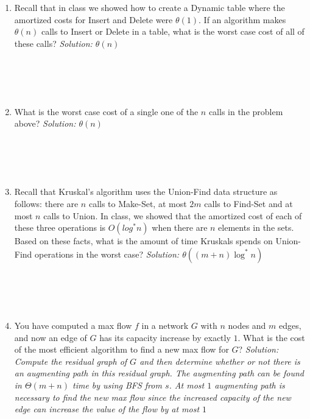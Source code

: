 \documentclass[11pt]{article}
\newcommand{\ans}[1]{\emph{Solution: #1}}
\begin{document}
\begin{enumerate}
\begin{enumerate}
\item Recall that in class we showed how to create a Dynamic table where the amortized costs for Insert and Delete were $\theta(1)$.  If an algorithm makes $\theta(n)$ calls to Insert or Delete in a table, what is the worst case cost of all of these calls?  \ans{$\theta(n)$} \\ \ \\ \ \\ \ \\ \ \\

\item What is the worst case cost of a single one of the $n$ calls in the problem above?  \ans{$\theta(n)$} \\ \ \\ \ \\ \ \\ \ \\

\item Recall that Kruskal's algorithm uses the Union-Find data structure as follows: there are $n$ calls to Make-Set, at most $2m$ calls to Find-Set and at most $n$ calls to Union.  In class, we showed that the amortized cost of each of these three operations is $O(log^{*} n)$ when there are $n$ elements in the sets.  Based on these facts, what is the amount of time Kruskals spends on Union-Find operations in the worst case?  \ans{$\theta((m+n)\log^{*}n)$} \\ \ \\ \ \\ \ \\ \ \\

\item You have computed a max flow $f$ in a network $G$ with $n$ nodes and $m$ edges, and now an edge of $G$ has its capacity increase by exactly $1$.  What is the cost of the most efficient algorithm to find a new max flow for $G$?
\ans{Compute the residual graph of $G$ and then determine whether or not there is an augmenting path in this residual graph.  The augmenting path can be found in $\Theta(m+n)$ time by using BFS from $s$.  At most $1$ augmenting path is necessary to find the new max flow since the increased capacity of the new edge can increase the value of the flow by at most $1$} \\ \ \\ \ \\ \ \\ \ \\


\end{enumerate}
\end{enumerate}
\end{document}
